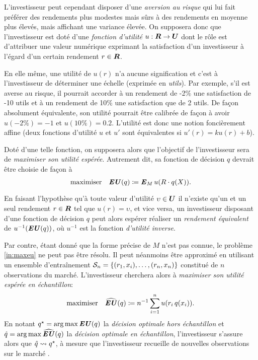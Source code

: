 L'investisseur peut cependant disposer d'une \textit{aversion au risque} qui lui fait
préférer des rendements plus modestes mais sûrs à des rendements en moyenne plus élevés,
mais affichant une variance élevée. On supposera donc que l'investisseur est doté d'une
\textit{fonction d'utilité} $u:\R\to\Ut$ dont le rôle est d'attribuer une valeur numérique
exprimant la satisfaction d'un investisseur à l'égard d'un certain rendement $r \in \R$.

En elle même, une utilité de $u(r)$ n'a aucune signification et c'est à l'investisseur de
déterminer une échelle (exprimée en \textit{utils}). Par exemple, s'il est averse au
risque, il pourrait accorder à un rendement de -2\% une satisfaction de -10 utils et à un
rendement de 10\% une satisfaction que de 2 utils. De façon absolument équivalente, son
utilité pourrait être calibrée de façon à avoir $u(-2\%) = -1$ et $u(10\%) =
0.2$. L'utilité est donc une notion foncièrement affine (deux fonctions d'utilité $u$ et
$u'$ sont équivalentes si $u'(r) = ku(r) + b$).

Doté d'une telle fonction, on supposera alors que l'objectif de l'investisseur sera de
\textit{maximiser son utilité espérée}. Autrement dit, sa fonction de décision $q$
devrait être choisie de façon à
\begin{equation}
  \label{in:maxeu}
  \maximizeEquation{\EU(q) \coloneqq \E_M u(R\cdot q(X)).}
\end{equation}
En faisant l'hypothèse qu'à toute valeur d'utilité $\upsilon \in \Ut$ il n'existe qu'un et un seul
rendement $r \in \R$ tel que $u(r) = \upsilon$, et vice versa, un investisseur disposant d'une
fonction de décision $q$ peut alors espérer réaliser un \textit{rendement équivalent} de
$u^{-1}(\EU(q))$, où $u^{-1}$ est la fonction \textit{d'utilité inverse}.

Par contre, étant donné que la forme précise de $M$ n'est pas connue, le problème
\eqref{in:maxeu} ne peut pas être résolu. Il peut néanmoins être approximé en utilisant un
ensemble d'entraînement $\S_n = \{(r_1,x_i),\ldots,(r_n,x_n)\}$ constitué de $n$ observations
du marché. L'investisseur cherchera alors à \textit{maximiser son utilité espérée en
  échantillon}:
\begin{equation}
  \maximizeEquation{\hEU(q) \coloneqq n^{-1} \sumi u(r_i\,q(x_i)).}
\end{equation}
En notant $q^\star = \argmax\EU(q)$ la \textit{décision optimale hors échantillon} et
$\qh = \argmax\hEU(q)$ la \textit{décision optimale en échantillon}, l'investisseur
s'assure alors que $\qh \leadsto q^\star$, à mesure que l'investisseur recueille de nouvelles
observations sur le marché \cite{shapiro2009lectures}.

